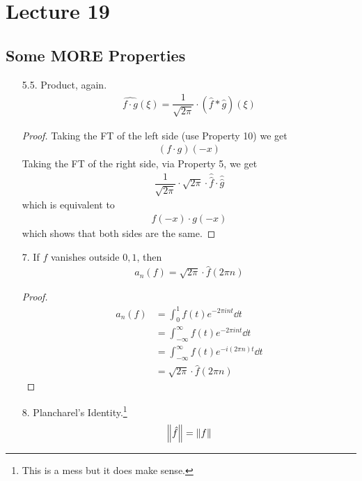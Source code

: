 \section{Lecture 19}
\subsection{Some MORE Properties}
\begin{enumerate}
    \item[5.5.] Product, again.
    \begin{align}
        \widehat{f \cdot g}(\xi) = \dfrac{1}{\sqrt{2\pi}} \cdot (\hat{f} * \hat{g})(\xi)
    \end{align}
    \begin{proof}
        Taking the FT of the left side (use Property 10) we get
        \begin{align}
            (f \cdot g)(-x)
        \end{align}
        Taking the FT of the right side, via Property 5, we get
        \begin{align}
            \dfrac{1}{\sqrt{2\pi}} \cdot \sqrt{2\pi} \cdot \hat{\hat{f}} \cdot \hat{\hat{g}}
        \end{align}
        which is equivalent to
        \begin{align}
            f(-x) \cdot g(-x)
        \end{align}
        which shows that both sides are the same.
    \end{proof}
    \item[7.] If $f$ vanishes outside $0, 1$, then
    \begin{align}
        a_n(f) = \sqrt{2\pi} \cdot \hat{f}(2\pi n)
    \end{align}
    \begin{proof}
        \begin{align}
            a_n(f) &= \int_0^1 f(t) e^{-2\pi in t} \dd{t}\\
            &= \int_{-\infty}^\infty f(t) e^{-2\pi in t} \dd{t}\\
            &= \int_{-\infty}^\infty f(t) e^{-i (2\pi n) t} \dd{t}\\
            &= \sqrt{2\pi} \cdot \hat{f}(2\pi n)
        \end{align}
    \end{proof}
    \item[8.] Plancharel's Identity.\footnote{This is a mess but it does make sense.}
    \begin{align}
        \norm{\hat{f}} = \norm{f}

\end{align}
\end{enumerate}
